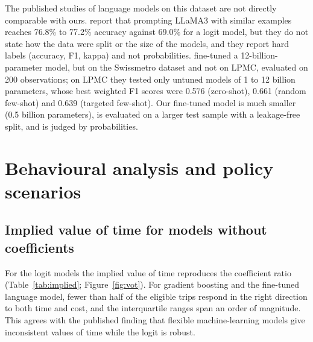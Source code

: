 \documentclass[11pt,a4paper]{article}
\newcommand{\gbp}{\pounds}
\newcommand{\tabpath}{tables/}
\begin{document}
The published studies of language models on this dataset are not directly comparable with ours. \citet{zhai2024} report that prompting LLaMA3 with similar examples reaches 76.8\% to 77.2\% accuracy against 69.0\% for a logit model, but they do not state how the data were split or the size of the models, and they report hard labels (accuracy, F1, kappa) and not probabilities. \citet{alsaleh2025} fine-tuned a 12-billion-parameter model, but on the Swissmetro dataset and not on LPMC, evaluated on 200 observations; on LPMC they tested only untuned models of 1 to 12 billion parameters, whose best weighted F1 scores were 0.576 (zero-shot), 0.661 (random few-shot) and 0.639 (targeted few-shot). Our fine-tuned model is much smaller (0.5 billion parameters), is evaluated on a larger test sample with a leakage-free split, and is judged by probabilities.

\begin{table}[H]
\centering\small

\caption{Ablation of the Multinomial Logit specification, trained on four training folds and scored on the fifth (training years only). Fare variables: fare type and bus scale.}
\label{tab:ablation}
\end{table}

\section{Behavioural analysis and policy scenarios}
\label{sec:behaviour}

\subsection{Implied value of time for models without coefficients}
For the logit models the implied value of time reproduces the coefficient ratio (Table~\ref{tab:implied}; Figure~\ref{fig:vot}). For gradient boosting and the fine-tuned language model, fewer than half of the eligible trips respond in the right direction to both time and cost, and the interquartile ranges span an order of magnitude. This agrees with the published finding that flexible machine-learning models give inconsistent values of time while the logit is robust.

\begin{table}[H]
\centering\footnotesize

\caption{Implied value of time (\gbp{} per hour) from probability responses on the 1,000-trip scenario sample. IQR: interquartile range. Right signs / eligible: trips for which probability falls with both time and cost, out of the trips with enough cost and time to be eligible.}
\label{tab:implied}
\end{table}
\end{document}
